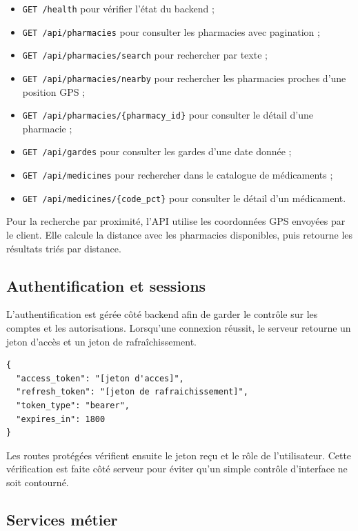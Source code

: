 \begin{itemize}
    \item \texttt{GET /health} pour vérifier l'état du backend ;
    \item \texttt{GET /api/pharmacies} pour consulter les pharmacies avec pagination ;
    \item \texttt{GET /api/pharmacies/search} pour rechercher par texte ;
    \item \texttt{GET /api/pharmacies/nearby} pour rechercher les pharmacies proches d'une position GPS ;
    \item \texttt{GET /api/pharmacies/\{pharmacy\_id\}} pour consulter le détail d'une pharmacie ;
    \item \texttt{GET /api/gardes} pour consulter les gardes d'une date donnée ;
    \item \texttt{GET /api/medicines} pour rechercher dans le catalogue de médicaments ;
    \item \texttt{GET /api/medicines/\{code\_pct\}} pour consulter le détail d'un médicament.
\end{itemize}

Pour la recherche par proximité, l'API utilise les coordonnées GPS envoyées par le client. Elle calcule la
distance avec les pharmacies disponibles, puis retourne les résultats triés par distance.

\subsection{Authentification et sessions}

L'authentification est gérée côté backend afin de garder le contrôle sur les comptes et les autorisations.
Lorsqu'une connexion réussit, le serveur retourne un jeton d'accès et un jeton de rafraîchissement.

\begin{lstlisting}[caption={Structure simplifiée d'une réponse de connexion}]
{
  "access_token": "[jeton d'acces]",
  "refresh_token": "[jeton de rafraichissement]",
  "token_type": "bearer",
  "expires_in": 1800
}
\end{lstlisting}

Les routes protégées vérifient ensuite le jeton reçu et le rôle de l'utilisateur. Cette vérification est faite
côté serveur pour éviter qu'un simple contrôle d'interface ne soit contourné.

\subsection{Services métier}

